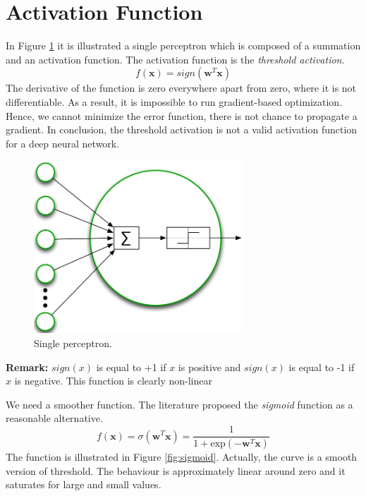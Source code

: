 \section{Activation Function}
In Figure \ref{fig:perceptron_activation_function} it is illustrated a single perceptron
which is composed of a summation and an activation function. The activation
function is the \textit{threshold activation}.
\[
	f(\pmb{x}) = \mathit{sign}(\pmb{w}^{T}\pmb{x})
\]
The derivative of the function is zero everywhere apart from zero, where it is not
differentiable. As a result, it is impossible to run gradient-based optimization.
Hence, we cannot minimize the error function, there is not chance to propagate a
gradient. In conclusion, the threshold activation is not a valid activation
function for a deep neural network.
\newline

\begin{figure}[H]
	\centering
	\includegraphics[width=0.7\textwidth]{
		images/16_DeepLearning_perceptronActivationFunction.png
	}
	\caption{Single perceptron.}
	\label{fig:perceptron_activation_function}
\end{figure}

\textbf{Remark:} $\mathit{sign(x)}$ is equal to +1 if $x$ is positive and $\mathit{sign(x)}$
is equal to -1 if $x$ is negative. This function is clearly non-linear
\newline

We need a smoother function. The literature proposed the \textit{sigmoid}
function as a reasonable alternative.
\begin{equation}
	f(\pmb{x}) = \sigma(\pmb{w}^{T}\pmb{x}) = \frac{1}{1+\text{exp}(-\pmb{w}^{T}\pmb{x})}
\end{equation}
The function is illustrated in Figure \ref{fig:sigmoid}. Actually, the curve is a
smooth version of threshold. The behaviour is approximately linear around zero
and it saturates for large and small values.
\newline

